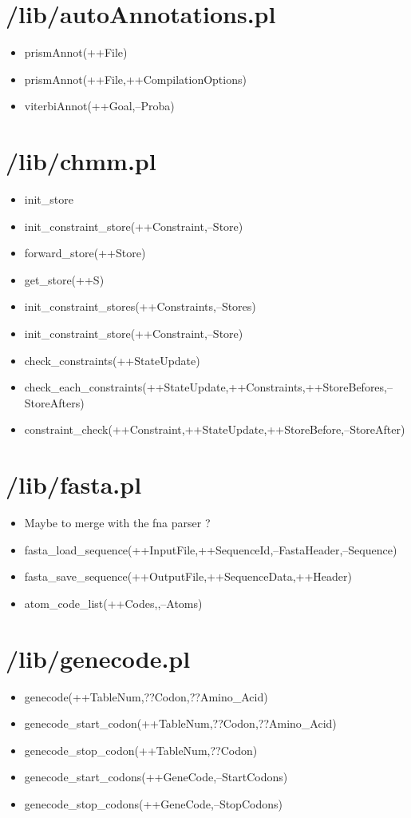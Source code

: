 \section{/lib/autoAnnotations.pl}
%
\begin{itemize}
\item prismAnnot(++File)
\item prismAnnot(++File,++CompilationOptions)
\item viterbiAnnot(++Goal,--Proba)
\end{itemize}


\section{/lib/chmm.pl}
%
\begin{itemize}
\item init\_store
\item init\_constraint\_store(++Constraint,--Store)
\item forward\_store(++Store)
\item get\_store(++S)
\item init\_constraint\_stores(++Constraints,--Stores)
\item init\_constraint\_store(++Constraint,--Store)
\item check\_constraints(++StateUpdate)
\item check\_each\_constraints(++StateUpdate,++Constraints,++StoreBefores,--StoreAfters)
\item constraint\_check(++Constraint,++StateUpdate,++StoreBefore,--StoreAfter)
\end{itemize}


\section{/lib/fasta.pl}
%
\begin{itemize}
\item Maybe to merge with the fna parser ?
\item fasta\_load\_sequence(++InputFile,++SequenceId,--FastaHeader,--Sequence) 
\item fasta\_save\_sequence(++OutputFile,++SequenceData,++Header) 
\item atom\_code\_list(++Codes,,--Atoms)
\end{itemize}

\section{/lib/genecode.pl}
%
\begin{itemize}
\item genecode(++TableNum,??Codon,??Amino\_Acid)
\item genecode\_start\_codon(++TableNum,??Codon,??Amino\_Acid)
\item genecode\_stop\_codon(++TableNum,??Codon)
\item genecode\_start\_codons(++GeneCode,--StartCodons)
\item genecode\_stop\_codons(++GeneCode,--StopCodons)
\end{itemize}

